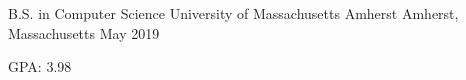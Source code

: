 \begin{cventries}
  \cventry
    {B.S. in Computer Science}
    {University of Massachusetts Amherst}
    {Amherst, Massachusetts}
    {May 2019}
    {
      \begin{cvitems}
        \item {GPA: 3.98}
      \end{cvitems}
    }
\end{cventries}
